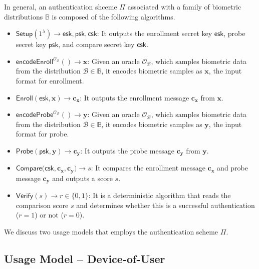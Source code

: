 In general, an authentication shceme $\Pi$ associated with a family of biometric distributions $\mathbb{B}$ is composed of the following algorithms.

\begin{itemize}

	\item $\textsf{Setup}(1^\lambda) \to \textsf{esk}, \textsf{psk}, \textsf{csk}$: It outputs the enrollment secret key $\textsf{esk}$, probe secret key $\textsf{psk}$, and compare secret key $\sf csk$.

	\item $\textsf{encodeEnroll}^{\mathcal{O}_{\mathcal{B}}}() \to \mathbf{x}$: Given an oracle $\mathcal{O}_{\mathcal{B}}$, which samples biometric data from the distribution $\mathcal{B} \in \mathbb{B}$, it encodes biometric samples as $\mathbf{x}$, the input format for enrollment. 

	\item $\textsf{Enroll}(\textsf{esk}, \mathbf{x}) \to \mathbf{c_x}$: It outputs the enrollment message $\mathbf{c_x}$ from $\mathbf{x}$.

	\item $\textsf{encodeProbe}^{\mathcal{O}_{\mathcal{B}}}() \to \mathbf{y}$: Given an oracle $\mathcal{O}_{\mathcal{B}}$, which samples biometric data from the distribution $\mathcal{B} \in \mathbb{B}$, it encodes biometric samples as $\mathbf{y}$, the input format for probe.

	\item $\textsf{Probe}(\textsf{psk}, \mathbf{y}) \to \mathbf{c_y}$: It outputs the probe message $\mathbf{c_y}$ from $\mathbf{y}$.

	\item $\textsf{Compare}(\textsf{csk}, \mathbf{c_x}, \mathbf{c_y)} \to s$: It compares the enrollment message $\mathbf{c_x}$ and probe message $\mathbf{c_y}$ and outputs a score $s$.

	\item $\textsf{Verify}(s) \to r \in \{0,1\}$: It is a deterministic algorithm that reads the comparison score $s$ and determines whether this is a successful authentication ($r = 1$) or not ($r = 0$).

\end{itemize}

\noindent 
We discuss two usage models that employs the authentication scheme $\Pi$.




\subsection{Usage Model – Device-of-User}
\label{sec:dou_model}

